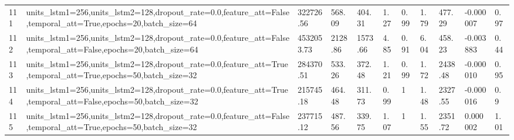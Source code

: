 \begin{longtable}{C{0.8cm} L{2cm} C{1.15cm} C{1.15cm} C{1.15cm} C{1.15cm} C{0.85cm} C{1.25cm} C{1.2cm} C{1.5cm} C{1.0cm}}
111 & units\_lstm1=256,\newline units\_lstm2=128,\newline dropout\_rate=0.0,\newline feature\_att=False,\newline temporal\_att=True,\newline epochs=20,\newline batch\_size=64 & 322726.56 & 568.09 & 404.31 & 1.27 & 0.99 & 1.79 & 477.29 & -0.000007 & 0.97 \\
112 & units\_lstm1=256,\newline units\_lstm2=128,\newline dropout\_rate=0.0,\newline feature\_att=False,\newline temporal\_att=False,\newline epochs=20,\newline batch\_size=64 & 4532053.73 & 2128.86 & 1573.66 & 4.85 & 0.91 & 6.04 & 458.23 & -0.003883 & 0.44 \\
113 & units\_lstm1=256,\newline units\_lstm2=128,\newline dropout\_rate=0.0,\newline feature\_att=True,\newline temporal\_att=True,\newline epochs=50,\newline batch\_size=32 & 284370.51 & 533.26 & 372.48 & 1.21 & 0.99 & 1.72 & 2438.48 & -0.000010 & 0.95 \\
114 & units\_lstm1=256,\newline units\_lstm2=128,\newline dropout\_rate=0.0,\newline feature\_att=True,\newline temporal\_att=False,\newline epochs=50,\newline batch\_size=32 & 215745.18 & 464.48 & 311.73 & 0.99 & 1 & 1.48 & 2327.55 & -0.000016 & 0.9 \\
115 & units\_lstm1=256,\newline units\_lstm2=128,\newline dropout\_rate=0.0,\newline feature\_att=False,\newline temporal\_att=True,\newline epochs=50,\newline batch\_size=32 & 237715.12 & 487.56 & 339.75 & 1.07 & 1 & 1.55 & 2351.72 & 0.000002 & 1.01 \\

\end{longtable}

